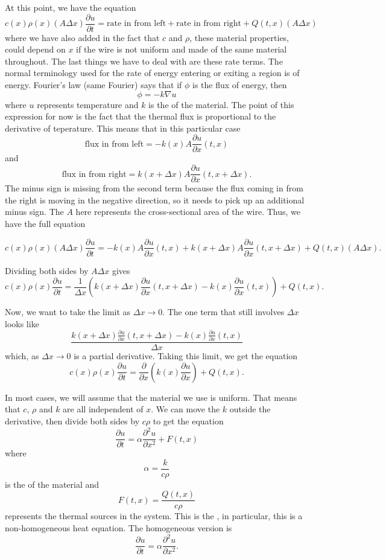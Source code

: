 At this point, we have the equation
\[  c(x)\rho(x) (A\Delta x)\frac{\partial u}{\partial t}  = \text{rate in from left} + \text{rate in from right} + Q(t,x)(A \Delta x) \] where we have also added in the fact that $c$ and $\rho$, these material properties, could depend on $x$ if the wire is not uniform and made of the same material throughout. The last things we have to deal with are these rate terms. The normal terminology used for the rate of energy entering or exiting a region is \emph{} of energy. Fourier's law (same Fourier) says that if $\phi$ is the flux of energy, then \[ \phi = -k \nabla u \] where $u$ represents temperature and $k$ is the \emph{} of the material. The point of this expression for now is the fact that the thermal flux is proportional to the derivative of teperature. This means that in this particular case
\[ \text{flux in from left} = -k(x) A\frac{\partial u}{\partial x}(t, x) \] and 
\[ \text{flux in from right} = k(x+\Delta x) A \frac{\partial u}{\partial x}(t, x+\Delta x). \] The minus sign is missing from the second term because the flux coming in from the right is moving in the negative direction, so it needs to pick up an additional minus sign. The $A$ here represents the cross-sectional area of the wire. Thus, we have the full equation

\[  c(x)\rho(x) (A\Delta x)\frac{\partial u}{\partial t}  = -k(x) A\frac{\partial u}{\partial x}(t, x) + k(x+\Delta x) A \frac{\partial u}{\partial x}(t, x+\Delta x) + Q(t,x)(A \Delta x). \]

Dividing both sides by $A \Delta x$ gives
\[ c(x)\rho(x) \frac{\partial u}{\partial t} = \frac{1}{\Delta x}\left( k(x+\Delta x) \frac{\partial u}{\partial x}(t, x+\Delta x) - k(x) \frac{\partial u}{\partial x}(t, x) \right) + Q(t,x). \]

Now, we want to take the limit as $\Delta x \rightarrow 0$. The one term that still involves $\Delta x$ looks like
\[ \frac{ k(x+\Delta x) \frac{\partial u}{\partial x}(t, x+\Delta x) - k(x) \frac{\partial u}{\partial x}(t, x) }{\Delta x} \] which, as $\Delta x \rightarrow 0$ is a partial derivative. Taking this limit, we get the equation
\[ c(x)\rho(x) \frac{\partial u}{\partial t} = \frac{\partial}{\partial x}\left(k(x) \frac{\partial u}{\partial x}\right) + Q(t,x). \]

In most cases, we will assume that the material we use is uniform. That means that $c$, $\rho$ and $k$ are all independent of $x$. We can move the $k$ outside the derivative, then divide both sides by $c\rho$ to get the equation
\[ \frac{\partial u}{\partial t} = \alpha \frac{\partial^2 u}{\partial x^2} + F(t,x) \] where 
\[ \alpha = \frac{k}{c\rho} \] is the \emph{} of the material and 
\[ F(t,x) = \frac{Q(t,x)}{c\rho} \] represents the thermal sources in the system. This is the \emph{}, in particular, this is a non-homogeneous heat equation. The homogeneous version is
\[ \frac{\partial u}{\partial t} = \alpha \frac{\partial^2 u}{\partial x^2}. \]

